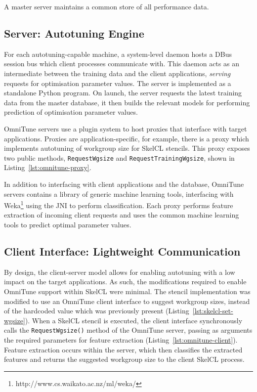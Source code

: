 A master server maintains a common store of all performance
data. 


\subsection{Server: Autotuning Engine}

For each autotuning-capable machine, a system-level daemon hosts a
DBus session bus which client processes communicate with. This daemon
acts as an intermediate between the training data and the client
applications, \emph{serving} requests for optimisation parameter
values. The server is implemented as a standalone Python program. On
launch, the server requests the latest training data from the master
database, it then builds the relevant models for performing prediction
of optimisation parameter values. 

OmniTune servers use a plugin system to host proxies that interface
with target applications. Proxies are application-specific, for
example, there is a proxy which implements autotuning of workgroup
size for SkelCL stencils. This proxy exposes two public methods,
\texttt{RequestWgsize} and \texttt{RequestTrainingWgsize}, shown in
Listing~\ref{lst:omnitune-proxy}.

In addition to interfacing with client applications and the database,
OmniTune servers contains a library of generic machine learning tools,
interfacing with Weka\footnote{http://www.cs.waikato.ac.nz/ml/weka/}
using the JNI to perform classification. Each proxy performs feature
extraction of incoming client requests and uses the common machine
learning tools to predict optimal parameter values. 




\subsection{Client Interface: Lightweight Communication}

By design, the client-server model allows for enabling autotuning with
a low impact on the target applications. As such, the modifications
required to enable OmniTune support within SkelCL were minimal. The
stencil implementation was modified to use an OmniTune client
interface to suggest workgroup sizes, instead of the hardcoded value
which was previously present
(Listing~\ref{lst:skelcl-set-wgsize}). When a SkelCL stencil is
executed, the client interface synchronously calls the
\texttt{RequestWgsize()} method of the OmniTune server, passing as
arguments the required parameters for feature extraction
(Listing~\ref{lst:omnitune-client}). Feature extraction occurs within
the server, which then classifies the extracted features and returns
the suggested workgroup size to the client SkelCL process.

